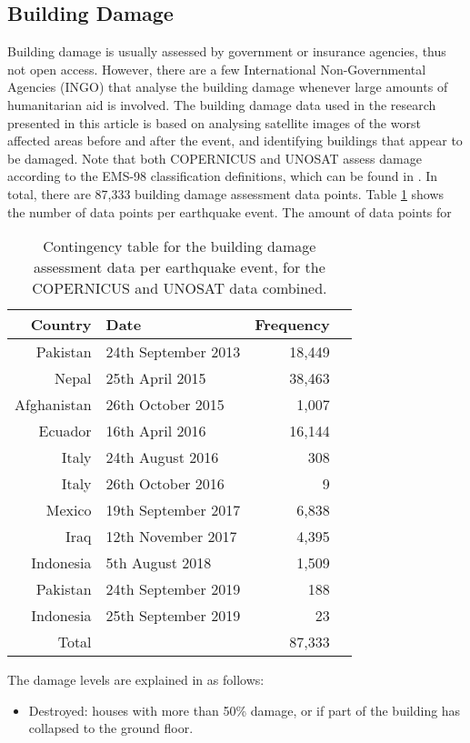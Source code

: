 \documentclass[10pt,a4paper]{article}
\begin{document}
\begin{multicols}{1}
\subsection{Building Damage}\label{sec:BD}
Building damage is usually assessed by government or insurance agencies, thus not open access. However, there are a few International Non-Governmental Agencies (INGO) that analyse the building damage whenever large amounts of humanitarian aid is involved. The building damage data used in the research presented in this article is based on analysing satellite images of the worst affected areas before and after the event, and identifying buildings that appear to be damaged. Note that both COPERNICUS and UNOSAT assess damage according to the EMS-98 classification definitions, which can be found in \cite{JRC_BD}. In total, there are 87,333 building damage assessment data points. Table \ref{tab:BD} shows the number of data points per earthquake event. The amount of data points for
\begin{table}[ht]
      \caption{Contingency table for the building damage assessment data per earthquake event, for the COPERNICUS and UNOSAT data combined.}
  \label{tab:BD}
\centering
\begin{tabular}{rlrr}
  \hline
  Country & Date & Frequency \\ 
  \hline
  Pakistan & 24th September 2013 & 18,449 \\
  Nepal & 25th April 2015 & 38,463 \\ 
  Afghanistan & 26th October 2015 & 1,007 \\ 
  Ecuador & 16th April 2016 & 16,144 \\
  Italy & 24th August 2016 & 308 \\ 
  Italy & 26th October 2016 &   9 \\
  Mexico & 19th September 2017 & 6,838 \\ 
  Iraq & 12th November 2017 & 4,395 \\   
  Indonesia & 5th August 2018 & 1,509 \\
  Pakistan & 24th September 2019 & 188 \\   
  Indonesia & 25th September 2019 &  23 \\ 
  \hline
  Total & & 87,333 \\
  \hline
\end{tabular}
\end{table}
The damage levels are explained in \cite{unspider} as follows:
\begin{itemize}
  \item Destroyed: houses with more than 50\% damage, or if part of the building has collapsed to the ground floor.

\end{itemize}
\end{multicols}
\end{document}
